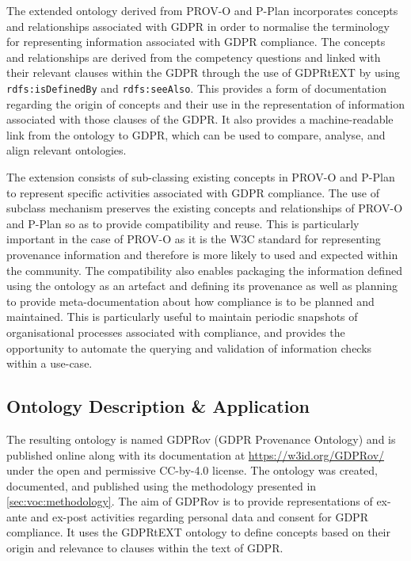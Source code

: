 The extended ontology derived from PROV-O and P-Plan incorporates concepts and relationships associated with GDPR in order to normalise the terminology for representing information associated with GDPR compliance.
The concepts and relationships are derived from the competency questions and linked with their relevant clauses within the GDPR through the use of GDPRtEXT by using \texttt{rdfs:isDefinedBy} and \texttt{rdfs:seeAlso}.
This provides a form of documentation regarding the origin of concepts and their use in the representation of information associated with those clauses of the GDPR.
It also provides a machine-readable link from the ontology to GDPR, which can be used to compare, analyse, and align relevant ontologies.

The extension consists of sub-classing existing concepts in PROV-O and P-Plan to represent specific activities associated with GDPR compliance. 
The use of subclass mechanism preserves the existing concepts and relationships of PROV-O and P-Plan so as to provide compatibility and reuse. This is particularly important in the case of PROV-O as it is the W3C standard for representing provenance information and therefore is more likely to used and expected within the community.
The compatibility also enables packaging the information defined using the ontology as an artefact and defining its provenance as well as planning to provide meta-documentation about how compliance is to be planned and maintained. This is particularly useful to maintain periodic snapshots of organisational processes associated with compliance, and provides the opportunity to automate the querying and validation of information checks within a use-case.

\subsection{Ontology Description \& Application}
The resulting ontology is named GDPRov (GDPR Provenance Ontology) and is published online along with its documentation at \url{https://w3id.org/GDPRov/} under the open and permissive CC-by-4.0 license.
The ontology was created, documented, and published using the methodology presented in \autoref{sec:voc:methodology}.
The aim of GDPRov is to provide representations of ex-ante and ex-post activities regarding personal data and consent for GDPR compliance.
It uses the GDPRtEXT ontology to define concepts based on their origin and relevance to clauses within the text of GDPR.

